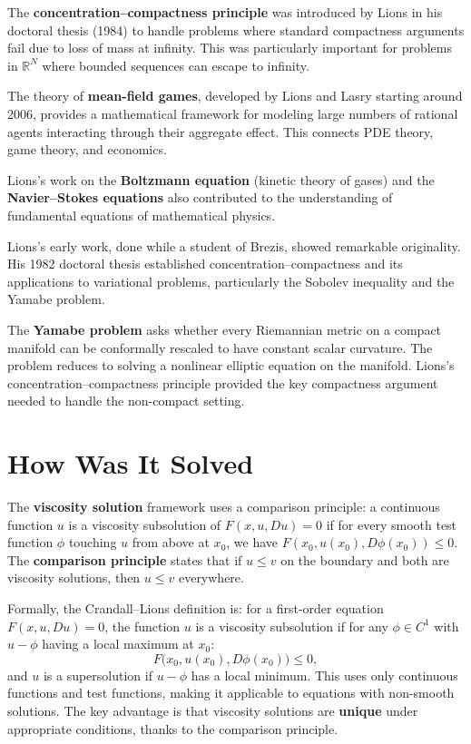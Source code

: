 The \textbf{concentration--compactness principle} was introduced by
Lions in his doctoral thesis (1984) to handle problems where
standard compactness arguments fail due to loss of mass at infinity.
This was particularly important for problems in $\mathbb{R}^N$
where bounded sequences can escape to infinity.

The theory of \textbf{mean-field games}, developed by Lions and
Lasry starting around 2006, provides a mathematical framework for
modeling large numbers of rational agents interacting through their
aggregate effect.  This connects PDE theory, game theory, and
economics.

Lions's work on the \textbf{Boltzmann equation} (kinetic theory of
gases) and the \textbf{Navier--Stokes equations} also contributed
to the understanding of fundamental equations of mathematical
physics.

Lions's early work, done while a student of Brezis, showed
remarkable originality.  His 1982 doctoral thesis established
concentration--compactness and its applications to variational
problems, particularly the Sobolev inequality and the Yamabe
problem.

The \textbf{Yamabe problem} asks whether every Riemannian metric on
a compact manifold can be conformally rescaled to have constant
scalar curvature.  The problem reduces to solving a nonlinear
elliptic equation on the manifold.  Lions's
concentration--compactness principle provided the key compactness
argument needed to handle the non-compact setting.

\section{How Was It Solved}

The \textbf{viscosity solution} framework uses a comparison
principle: a continuous function $u$ is a viscosity subsolution of
$F(x, u, Du) = 0$ if for every smooth test function $\phi$
touching $u$ from above at $x_0$, we have
$F(x_0, u(x_0), D\phi(x_0)) \leq 0$.  The \textbf{comparison
principle} states that if $u \leq v$ on the boundary and both are
viscosity solutions, then $u \leq v$ everywhere.

Formally, the Crandall--Lions definition is: for a first-order
equation $F(x,u,Du)=0$, the function $u$ is a viscosity
subsolution if for any $\phi\in C^1$ with $u-\phi$ having a local
maximum at $x_0$:
\[
  F\bigl(x_0, u(x_0), D\phi(x_0)\bigr) \leq 0,
\]
and $u$ is a supersolution if $u-\phi$ has a local minimum.  This
uses only continuous functions and test functions, making it
applicable to equations with non-smooth solutions.  The key
advantage is that viscosity solutions are \textbf{unique} under
appropriate conditions, thanks to the comparison principle.

